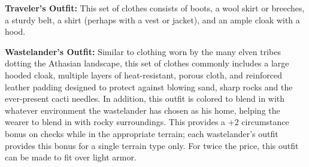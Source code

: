 \textbf{Traveler's Outfit:} This set of clothes consists of boots, a wool skirt or breeches, a sturdy belt, a shirt (perhaps with a vest or jacket), and an ample cloak with a hood.

\textbf{Wastelander's Outfit:} Similar to clothing worn by the many elven tribes dotting the Athasian landscape, this set of clothes commonly includes a large hooded cloak, multiple layers of heat-resistant, porous cloth, and reinforced leather padding designed to protect against blowing sand, sharp rocks and the ever-present cacti needles. In addition, this outfit is colored to blend in with whatever environment the wastelander has chosen as his home, helping the wearer to blend in with rocky surroundings. This provides a +2 circumstance bonus on  checks while in the appropriate terrain; each wastelander's outfit provides this bonus for a single terrain type only. For twice the price, this outfit can be made to fit over light armor.